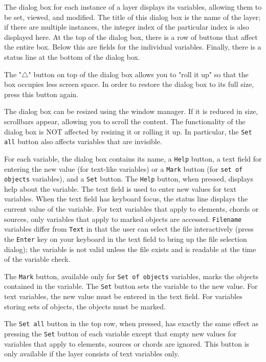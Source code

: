 \documentclass[a4paper,10pt]{report}
\begin{document}
The dialog box for each instance of a layer displays its variables,
allowing them to be set, viewed, and modified.
The title of this dialog box is the name of the layer; if there are
multiple instances, the integer index of the particular index
is also displayed here.  At the top of the dialog
box, there is a row of buttons that affect the entire box.
Below this are fields for the individual variables.  Finally, there
is a status line at the bottom of the dialog box.

The "$\bigtriangleup$"
button on top of the dialog box allows you to "roll it up"
so that the box occupies less screen space. In
order to restore the dialog box to its full size, press this button
again.

The dialog box can be resized using the window manager. If it is
reduced in size, scrollbars appear, allowing you to scroll the
content. The functionality of the dialog box is NOT affected by
resizing it or rolling it up. In particular, the {\tt Set all} button also
affects variables that are invisible.

For each variable, the dialog box contains its name, a {\tt Help} button, a
text field for entering the new value (for text-like variables) or a
{\tt Mark}
button (for {\tt set of objects} variables), and a {\tt Set} button.
The {\tt Help} button, when pressed, displays help about the variable.
The text field is used to enter new values for text variables. When
the text field has keyboard focus, the status line displays the
current value of the variable. For text variables that apply to
elements, chords or sources, only variables that apply to marked
objects are accessed.  {\tt Filename} variables differ from {\tt Text}
in that the user can select the file interactively (press the
{\tt Enter} key on your keyboard in the text field to bring up the
file selection dialog); the variable is not valid unless the file
exists and is readable at the time of the variable check.

The {\tt Mark} button, available only for {\tt Set of objects} variables,
marks the objects contained in the variable.
The {\tt Set} button sets the variable to the new value. For text
variables, the new value must be entered in the text
field. For variables storing sets of objects, the objects must be
marked.

The {\tt Set all} button in the top row, when pressed, has exactly the
same effect as pressing the {\tt Set} button of each variable except that
empty new values for variables that apply to elements, sources or
chords are ignored. This button is only available if the layer
consists of text variables only.
\end{document}
